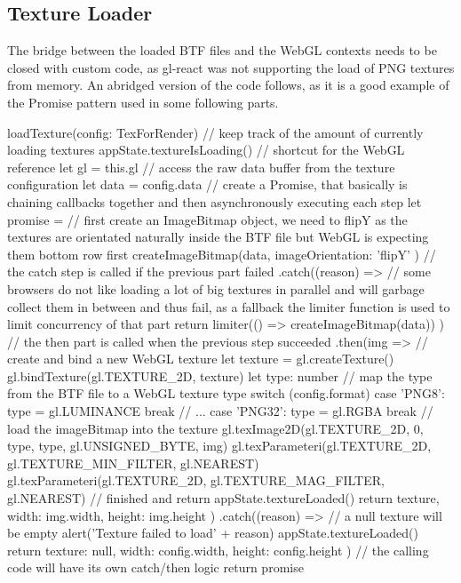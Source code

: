 \subsection{Texture Loader}\label{sec_textureloader}
The bridge between the loaded BTF files and the WebGL contexts needs to be
closed with custom code, as gl-react was not supporting the load of PNG textures
from memory. An abridged version of the code follows, as it is a good example of
the Promise pattern used in some following parts.
\begin{typescript}
loadTexture(config: TexForRender) {
    // keep track of the amount of currently loading textures
    appState.textureIsLoading()
    // shortcut for the WebGL reference
    let gl = this.gl
    // access the raw data buffer from the texture configuration
    let data = config.data
    // create a Promise, that basically is chaining callbacks together and then asynchronously executing each step
    let promise =
        // first create an ImageBitmap object, we need to flipY as the textures
        are orientated naturally inside the BTF file but WebGL is expecting them bottom row first
        createImageBitmap(data, { imageOrientation: 'flipY' })
        // the catch step is called if the previous part failed
        .catch((reason) => {
            // some browsers do not like loading a lot of big textures in parallel and will garbage collect them in between and thus fail, as a fallback the limiter function is used to limit concurrency of that part
            return limiter(() => createImageBitmap(data))
        })
        // the then part is called when the previous step succeeded
        .then(img => {
            // create and bind a new WebGL texture
            let texture = gl.createTexture()
            gl.bindTexture(gl.TEXTURE_2D, texture)
            let type: number
            // map the type from the BTF file to a WebGL texture type
            switch (config.format) {
                case 'PNG8':
                    type = gl.LUMINANCE
                    break
                // ...
                case 'PNG32':
                    type = gl.RGBA
                    break
            }
            // load the imageBitmap into the texture
            gl.texImage2D(gl.TEXTURE_2D, 0, type, type, gl.UNSIGNED_BYTE, img)
            gl.texParameteri(gl.TEXTURE_2D, gl.TEXTURE_MIN_FILTER, gl.NEAREST)
            gl.texParameteri(gl.TEXTURE_2D, gl.TEXTURE_MAG_FILTER, gl.NEAREST)
            // finished and return
            appState.textureLoaded()
            return { texture, width: img.width, height: img.height }
        })
        .catch((reason) => {
            // a null texture will be empty
            alert('Texture failed to load' + reason)
            appState.textureLoaded()
            return { texture: null, width: config.width, height: config.height }
        })
   // the calling code will have its own catch/then logic
   return promise
}
\end{typescript}

